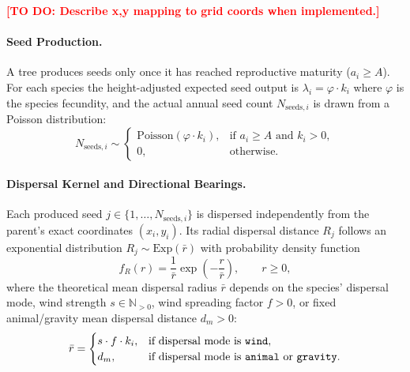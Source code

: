 \documentclass[a4paper,11pt]{scrartcl}
\newcommand{\N}{\mathbb{N}}
\newcommand{\p}{\varphi}
\newcommand{\la}{\lambda}
\DeclareRobustCommand{\todo}[1]{\textcolor{red}{\textbf{[TO DO: #1]}}}
\begin{document}
\todo{Describe x,y mapping to grid coords when implemented.}

\paragraph{Seed Production.}
A tree produces seeds only once it has reached reproductive maturity ($a_i \ge A$). For each species the height-adjusted expected seed output is $\la_i = \p \cdot k_i$ where $\p$ is the species fecundity, and the actual annual seed count $N_{\text{seeds}, i}$ is drawn from a Poisson distribution:
\begin{equation}
\label{eq:fecundity}
N_{\text{seeds}, i} \sim
\begin{cases}
\text{Poisson}(\p \cdot k_i), & \text{if } a_i \ge A \text{ and } k_i > 0, \\
0, & \text{otherwise.}
\end{cases}
\end{equation}

\paragraph{Dispersal Kernel and Directional Bearings.}
Each produced seed $j \in \{1, \dots, N_{\text{seeds}, i}\}$ is dispersed independently from the parent's exact coordinates $(x_i, y_i)$. Its radial dispersal distance $R_j$ follows an exponential distribution $R_j \sim \text{Exp}(\bar{r})$ with probability density function
\begin{equation}
\label{eq:exp_pdf}
f_R(r) = \frac{1}{\bar{r}} \exp\!\left(-\frac{r}{\bar{r}}\right), \qquad r \ge 0,
\end{equation}
where the theoretical mean dispersal radius $\bar{r}$ depends on the species' dispersal mode, wind strength $s \in \N_{>0}$, wind spreading factor $f > 0$, or fixed animal/gravity mean dispersal distance $d_m > 0$:
\begin{equation}
\label{eq:mean_radius}
\bar{r} =
\begin{cases}
s \cdot f \cdot k_i, & \text{if dispersal mode is \texttt{wind}}, \\
d_m, & \text{if dispersal mode is \texttt{animal} or \texttt{gravity}}.
\end{cases}
\end{equation}
\end{document}

